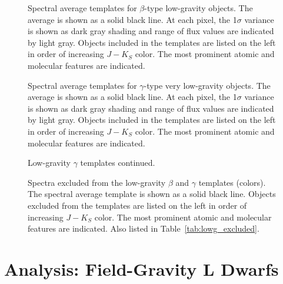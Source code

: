 \documentclass[12pt]{aastex6}
\begin{document}
\clearpage
\begin{figure}
  \caption{Spectral average templates for $\beta$-type low-gravity objects. The average is shown as a solid black line. At each pixel, the 1$\sigma$ variance is shown as dark gray shading and range of flux values are indicated by light gray. Objects included in the templates are listed on the left in order of increasing $J-K_S$ color. The most prominent atomic and molecular features are indicated. }
  \label{fig:beta_templates}
\end{figure}

\begin{figure}
  \caption{Spectral average templates for $\gamma$-type very low-gravity objects. The average is shown as a solid black line. At each pixel, the 1$\sigma$ variance is shown as dark gray shading and range of flux values are indicated by light gray. Objects included in the templates are listed on the left in order of increasing $J-K_S$ color. The most prominent atomic and molecular features are indicated. }
  \label{fig:gamma_templates}
\end{figure}

\begin{figure}
  \caption{Low-gravity $\gamma$ templates continued.}
\end{figure}

\begin{figure}
  \caption{Spectra excluded from the low-gravity $\beta$ and $\gamma$ templates (colors). The spectral average template is shown as a solid black line. Objects excluded from the templates are listed on the left in order of increasing $J-K_S$ color. The most prominent atomic and molecular features are indicated. Also listed in Table~\ref{tab:lowg_excluded}.}
  \label{fig:lowg_excluded}
\end{figure}

\clearpage



\clearpage



\section{Analysis: Field-Gravity L Dwarfs}
\label{sec:fieldg}
\end{document}
